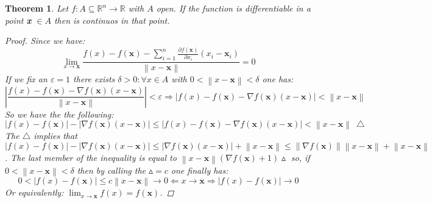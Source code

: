 \documentclass{article}
\newtheorem{theorem}{Theorem}
\begin{document}
    \begin{theorem} %
        Let $f : A \subseteq \mathbb{R}^n \rightarrow \mathbb{R}$ with $A$ open. If the function is differentiable in a point \textbf{x} $\in A$ then is continuos in that point.
        \begin{proof}
            Since we have:
            \begin{equation*}
                \lim_{x \to \textbf{x}}\frac{f(x) - f(\textbf{x}) - \sum_{i = 1}^{n} \frac{\partial f(\textbf{x})}{\partial x_i} \left(x_i - \textbf{x}_i \right)}{\left\lVert x - \textbf{x}\right\rVert} = 0
            \end{equation*}
            If we fix an $\varepsilon = 1$ there exists $\delta > 0 : \forall x \in A$ with $0 < \left\lVert x - \textbf{x} \right\rVert < \delta$ one has:
            \begin{equation*}
                \left\lvert \frac{f(x) - f(\textbf{x}) - \nabla f(\textbf{x})(x - \textbf{x})}{\left\lVert x - \textbf{x}\right\rVert} \right\rvert < \varepsilon \Longrightarrow \left\lvert f(x) - f(\textbf{x}) - \nabla f(\textbf{x})(x - \textbf{x}) \right\rvert < \left\lVert x - \textbf{x}\right\rVert
            \end{equation*}
            So we have the the following:
            \begin{equation*}
                \left\lvert f(x) - f(\textbf{x}) \right\rvert - \left\lvert \nabla f(\textbf{x})(x - \textbf{x}) \right\rvert \leq \left\lvert f(x) - f(\textbf{x}) - \nabla f(\textbf{x})(x - \textbf{x}) \right\rvert < \left\lVert x - \textbf{x}\right\rVert \ \bigtriangleup 
            \end{equation*}
            The $\bigtriangleup$ implies that $\left\lvert f(x) - f(\textbf{x}) \right\rvert - \left\lvert \nabla f(\textbf{x})(x - \textbf{x}) \right\rvert \leq \left\lvert \nabla f(\textbf{x})(x - \textbf{x}) \right\rvert + \left\lVert x - \textbf{x} \right\rVert \leq \left\lVert \nabla f(\textbf{x})\right\rVert \left\lVert x - \textbf{x} \right\rVert + \left\lVert x - \textbf{x} \right\rVert$. The last member of the inequality is equal to $\left\lVert x - \textbf{x} \right\rVert\left( \nabla f(\textbf{x}) + 1 \right)\vartriangle  $  so, if $ 0 < \left\lVert x - \textbf{x} \right\rVert < \delta$ then by calling the $\vartriangle = c$ one finally has:
            \begin{equation*}
                0 < \left\lvert f(x) - f(\textbf{x}) \right\rvert \leq c\left\lVert x - \textbf{x}\right\rVert \to 0 \Leftarrow x \to \textbf{x} \Rightarrow \left\lvert f(x) - f(\textbf{x}) \right\rvert \to 0
            \end{equation*}
            Or equivalently: $\lim_{x \to \textbf{x}}f(x) = f(\textbf{x})$.
        \end{proof}
    \end{theorem}
\end{document}
